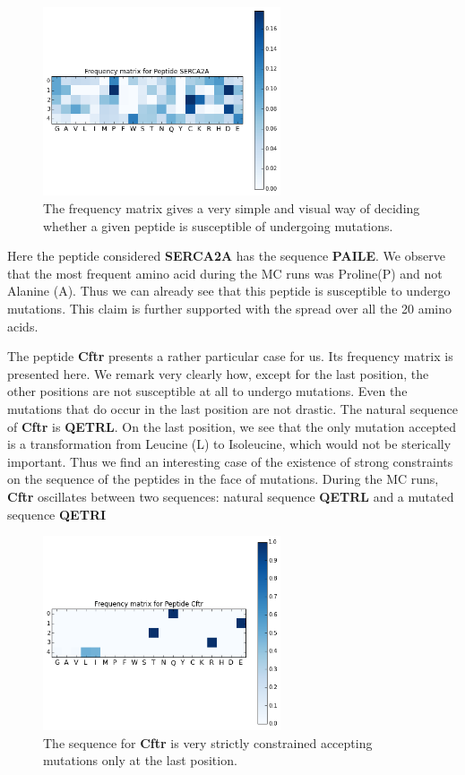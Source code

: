 \documentclass[a4paper, 12pt]{article}
\begin{document}
 	\begin{figure}[!h]
 	\label{freq_matrix}
 	\centering
 	\includegraphics[width=7cm]{Images/freq_matrix.png}
 	\caption{The frequency matrix gives a very simple and visual way of deciding whether a given peptide is susceptible of undergoing mutations.} 
 	\end{figure}

 	Here the peptide considered \textbf{SERCA2A} has the sequence \textbf{PAILE}. We observe that the most frequent amino acid during the MC runs was Proline(P) and not Alanine (A). Thus we can already see that this peptide is susceptible to undergo mutations. This claim is further supported with the spread over all the 20 amino acids. 

 	The peptide \textbf{Cftr} presents a rather particular case for us. Its frequency matrix is presented here. We remark very clearly how, except for the last position, the other positions are not susceptible at all to undergo mutations. Even the mutations that do occur in the last position are not drastic. The natural sequence of \textbf{Cftr} is \textbf{QETRL}. On the last position, we see that the only mutation accepted is a transformation from Leucine (L) to Isoleucine, which would not be sterically important. Thus we find an interesting case of the existence of strong constraints on the sequence of the peptides in the face of mutations. During the MC runs, \textbf{Cftr} oscillates between two sequences: natural sequence \textbf{QETRL} and a mutated sequence \textbf{QETRI} 

 	\begin{figure}
 	\label{cft_freq}
 	\centering
 	\includegraphics[width = 7cm]{Images/cftr.png}
 	\caption{The sequence for \textbf{Cftr} is very strictly constrained accepting mutations only at the last position.}
 	\end{figure} 
\end{document}
